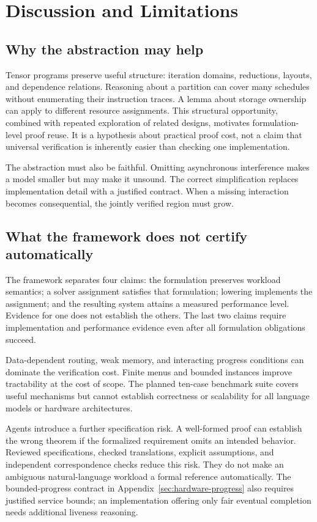 \documentclass[11pt]{article}
\begin{document}
\section{Discussion and Limitations}
\subsection{Why the abstraction may help}
Tensor programs preserve useful structure: iteration domains, reductions, layouts, and dependence relations. Reasoning about a partition can cover many schedules without enumerating their instruction traces. A lemma about storage ownership can apply to different resource assignments. This structural opportunity, combined with repeated exploration of related designs, motivates formulation-level proof reuse. It is a hypothesis about practical proof cost, not a claim that universal verification is inherently easier than checking one implementation.

The abstraction must also be faithful. Omitting asynchronous interference makes a model smaller but may make it unsound. The correct simplification replaces implementation detail with a justified contract. When a missing interaction becomes consequential, the jointly verified region must grow.

\subsection{What the framework does not certify automatically}
The framework separates four claims: the formulation preserves workload semantics; a solver assignment satisfies that formulation; lowering implements the assignment; and the resulting system attains a measured performance level. Evidence for one does not establish the others. The last two claims require implementation and performance evidence even after all formulation obligations succeed.

Data-dependent routing, weak memory, and interacting progress conditions can dominate the verification cost. Finite menus and bounded instances improve tractability at the cost of scope. The planned ten-case benchmark suite covers useful mechanisms but cannot establish correctness or scalability for all language models or hardware architectures.

Agents introduce a further specification risk. A well-formed proof can establish the wrong theorem if the formalized requirement omits an intended behavior. Reviewed specifications, checked translations, explicit assumptions, and independent correspondence checks reduce this risk. They do not make an ambiguous natural-language workload a formal reference automatically. The bounded-progress contract in Appendix~\ref{sec:hardware-progress} also requires justified service bounds; an implementation offering only fair eventual completion needs additional liveness reasoning.
\end{document}
